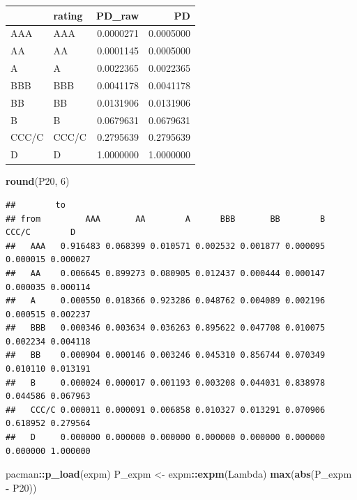 \documentclass[
  11pt,
]{article}
\newenvironment{Shaded}{\begin{snugshade}}{\end{snugshade}}
\newcommand{\DecValTok}[1]{\textcolor[rgb]{0.00,0.00,0.81}{#1}}
\newcommand{\FunctionTok}[1]{\textcolor[rgb]{0.13,0.29,0.53}{\textbf{#1}}}
\newcommand{\NormalTok}[1]{#1}
\newcommand{\OtherTok}[1]{\textcolor[rgb]{0.56,0.35,0.01}{#1}}
\newcommand{\SpecialCharTok}[1]{\textcolor[rgb]{0.81,0.36,0.00}{\textbf{#1}}}
\newcounter{none} %
\begin{document}
{\def\LTcaptype{none} %
\begin{longtable}[]{@{}llrr@{}}
\toprule\noalign{}
& rating & PD\_raw & PD \\
\midrule\noalign{}
\endhead
\bottomrule\noalign{}
\endlastfoot
AAA & AAA & 0.0000271 & 0.0005000 \\
AA & AA & 0.0001145 & 0.0005000 \\
A & A & 0.0022365 & 0.0022365 \\
BBB & BBB & 0.0041178 & 0.0041178 \\
BB & BB & 0.0131906 & 0.0131906 \\
B & B & 0.0679631 & 0.0679631 \\
CCC/C & CCC/C & 0.2795639 & 0.2795639 \\
D & D & 1.0000000 & 1.0000000 \\
\end{longtable}
}

\begin{Shaded}
\begin{Highlighting}[]
\FunctionTok{round}\NormalTok{(P20, }\DecValTok{6}\NormalTok{)}
\end{Highlighting}
\end{Shaded}

\begin{verbatim}
##        to
## from         AAA       AA        A      BBB       BB        B    CCC/C        D
##   AAA   0.916483 0.068399 0.010571 0.002532 0.001877 0.000095 0.000015 0.000027
##   AA    0.006645 0.899273 0.080905 0.012437 0.000444 0.000147 0.000035 0.000114
##   A     0.000550 0.018366 0.923286 0.048762 0.004089 0.002196 0.000515 0.002237
##   BBB   0.000346 0.003634 0.036263 0.895622 0.047708 0.010075 0.002234 0.004118
##   BB    0.000904 0.000146 0.003246 0.045310 0.856744 0.070349 0.010110 0.013191
##   B     0.000024 0.000017 0.001193 0.003208 0.044031 0.838978 0.044586 0.067963
##   CCC/C 0.000011 0.000091 0.006858 0.010327 0.013291 0.070906 0.618952 0.279564
##   D     0.000000 0.000000 0.000000 0.000000 0.000000 0.000000 0.000000 1.000000
\end{verbatim}

\begin{Shaded}
\begin{Highlighting}[]
\NormalTok{pacman}\SpecialCharTok{::}\FunctionTok{p\_load}\NormalTok{(expm)}
\NormalTok{P\_expm }\OtherTok{\textless{}{-}}\NormalTok{ expm}\SpecialCharTok{::}\FunctionTok{expm}\NormalTok{(Lambda)}
\FunctionTok{max}\NormalTok{(}\FunctionTok{abs}\NormalTok{(P\_expm }\SpecialCharTok{{-}}\NormalTok{ P20))}
\end{Highlighting}
\end{Shaded}
\end{document}
